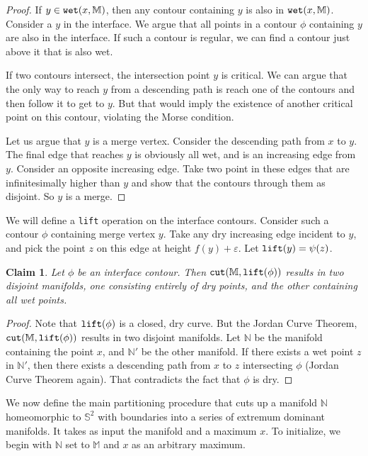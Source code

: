 \documentclass[11pt]{article}
\newtheorem{claim}[theorem]{Claim}
\theoremstyle{definition}
\newcommand{\MM}{\mathbb{M}}
\newcommand{\NN}{\mathbb{N}}
\newcommand{\SSS}{\mathbb{S}}
\newcommand{\eps}{\varepsilon}
\newcommand{\cut}{{\tt cut}}
\newcommand{\cont}{\psi}
\newcommand{\lift}{{\tt lift}}
\newcommand{\wet}{{\tt wet}}
\begin{document}
\begin{proof} If $y \in \wet(x,\MM)$, then any contour containing $y$ is also in $\wet(x,\MM)$.
Consider a $y$ in the interface. We argue that all points in a contour $\phi$ containing $y$
are also in the interface. If such a contour is regular, we can find a contour just above it that
is also wet. 

If two contours intersect, the intersection point $y$ is critical. We can argue that the only
way to reach $y$ from a descending path is reach one of the contours and then follow it to get to $y$.
But that would imply the existence of another critical point on this contour, violating the Morse condition.

Let us argue that $y$ is a merge vertex. Consider the descending path from $x$ to $y$. The final edge
that reaches $y$ is obviously all wet, and is an increasing edge from $y$. Consider an opposite increasing
edge. Take two point in these edges that are infinitesimally higher than $y$ and show that the contours
through them as disjoint. So $y$ is a merge.
\end{proof}

We will define a \lift{} operation on the interface contours. Consider such a contour $\phi$ containing
merge vertex $y$. Take any dry increasing edge incident to $y$, and pick the point $z$ on this edge at height
$f(y) + \eps$. Let $\lift(y) = \cont(z)$.

\begin{claim} \label{clm:cut-int} Let $\phi$ be an interface contour. Then $\cut(\MM,\lift(\phi))$
results in two disjoint manifolds, one consisting entirely of dry points, and the other containing
all wet points.
\end{claim}

\begin{proof} Note that $\lift(\phi)$ is a closed, dry curve. But the Jordan Curve Theorem,
$\cut(\MM,\lift(\phi))$ results in two disjoint manifolds. Let $\NN$ be the manifold containing
the point $x$, and $\NN'$ be the other manifold. If there exists a wet point $z$ in $\NN'$,
then there exists a descending path from $x$ to $z$ intersecting $\phi$ (Jordan Curve Theorem again).
That contradicts the fact that $\phi$ is dry.
\end{proof}

We now define the main partitioning procedure that cuts up a manifold $\NN$ homeomorphic to $\SSS^2$ with boundaries into a series of extremum
dominant manifolds. It takes as input the manifold and a maximum $x$. To initialize,
we begin with $\NN$ set to $\MM$ and $x$ as an arbitrary maximum.
\end{document}
